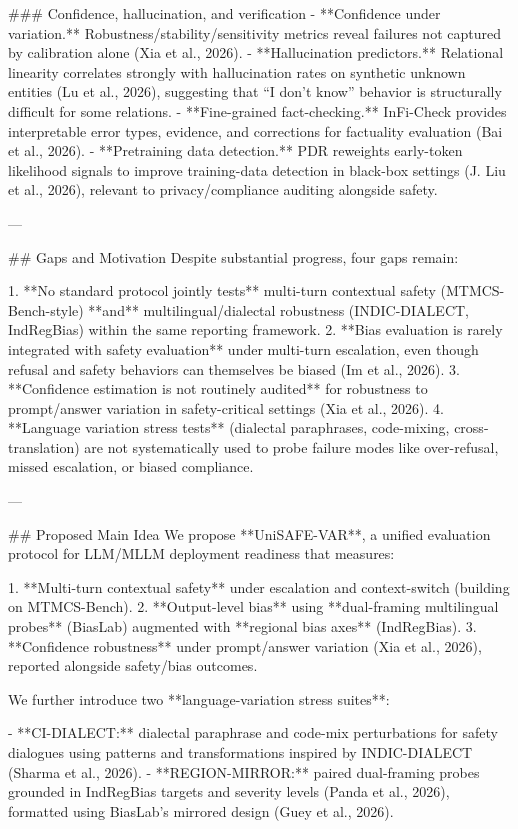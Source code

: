 ### Confidence, hallucination, and verification  
- **Confidence under variation.** Robustness/stability/sensitivity metrics reveal failures not captured by calibration alone (Xia et al., 2026).  
- **Hallucination predictors.** Relational linearity correlates strongly with hallucination rates on synthetic unknown entities (Lu et al., 2026), suggesting that “I don’t know” behavior is structurally difficult for some relations.  
- **Fine-grained fact-checking.** InFi-Check provides interpretable error types, evidence, and corrections for factuality evaluation (Bai et al., 2026).  
- **Pretraining data detection.** PDR reweights early-token likelihood signals to improve training-data detection in black-box settings (J. Liu et al., 2026), relevant to privacy/compliance auditing alongside safety.

---

## Gaps and Motivation  
Despite substantial progress, four gaps remain:

1. **No standard protocol jointly tests** multi-turn contextual safety (MTMCS-Bench-style) **and** multilingual/dialectal robustness (INDIC-DIALECT, IndRegBias) within the same reporting framework.  
2. **Bias evaluation is rarely integrated with safety evaluation** under multi-turn escalation, even though refusal and safety behaviors can themselves be biased (Im et al., 2026).  
3. **Confidence estimation is not routinely audited** for robustness to prompt/answer variation in safety-critical settings (Xia et al., 2026).  
4. **Language variation stress tests** (dialectal paraphrases, code-mixing, cross-translation) are not systematically used to probe failure modes like over-refusal, missed escalation, or biased compliance.

---

## Proposed Main Idea  
We propose **UniSAFE-VAR**, a unified evaluation protocol for LLM/MLLM deployment readiness that measures:

1. **Multi-turn contextual safety** under escalation and context-switch (building on MTMCS-Bench).  
2. **Output-level bias** using **dual-framing multilingual probes** (BiasLab) augmented with **regional bias axes** (IndRegBias).  
3. **Confidence robustness** under prompt/answer variation (Xia et al., 2026), reported alongside safety/bias outcomes.  

We further introduce two **language-variation stress suites**:

- **CI-DIALECT:** dialectal paraphrase and code-mix perturbations for safety dialogues using patterns and transformations inspired by INDIC-DIALECT (Sharma et al., 2026).  
- **REGION-MIRROR:** paired dual-framing probes grounded in IndRegBias targets and severity levels (Panda et al., 2026), formatted using BiasLab’s mirrored design (Guey et al., 2026).

